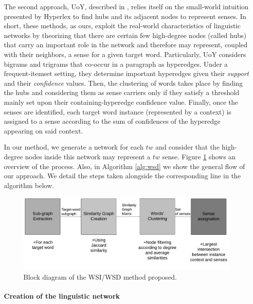 The second approach, {UoY}, described in \cite{2007.Klapaftis.UoY},  relies itself on the small-world intuition presented  by Hyperlex to find hubs and its adjacent nodes to represent senses.   In short, these methods, as ours, exploit the real-world characteristics of linguistic networks by theorizing that there are certain few high-degree nodes (called hubs) that carry an important role in the network and therefore may represent, coupled with their neighbors, a sense for a given target word. Particularly, UoY considers bigrams and trigrams that co-occur in a paragraph as hyperedges. Under a frequent-itemset setting, they determine important hyperedges given their \textit{support} and their \textit{confidence}  values. Then, the clustering of words takes place by finding the hubs and considering them as sense carriers only if they satisfy a threshold mainly set upon their containing-hyperedge confidence value. Finally, once the senses are identified, each target word instance (represented by a context) is assigned to a sense according to the sum of confidences of the hyperedge appearing on said context. 

In our method, we generate a network for each $tw$ and consider that the high-degree nodes inside this network may represent a $tw$ sense. Figure \ref{fig:wsd_wsi_process}  shows an overview of the process. Also, in Algorithm \ref{alg:wsd} we show the general flow of our approach.  We detail the steps taken alongside the corresponding line in the algorithm below. 

\begin{figure}
\centering
\includegraphics[width=1\linewidth]{images/Chapitre4/wsd_wsi_process.png}
\caption{Block diagram of the WSI/WSD method proposed.}
\label{fig:wsd_wsi_process}
\end{figure}


\paragraph{Creation of the linguistic network}

